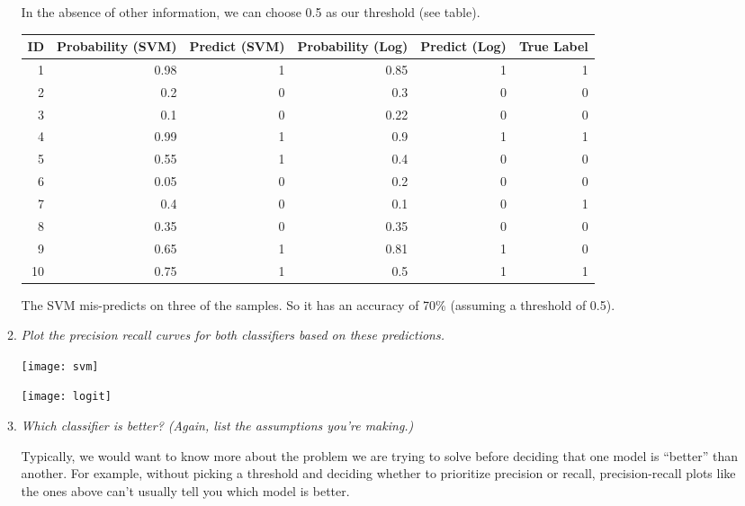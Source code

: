 \documentclass[11pt]{article}
\begin{document}
\begin{enumerate}
\begin{enumerate}
                In the absence of other information, we can choose 0.5 as our
                threshold (see table).

                \begin{table}[h!]
                \begin{tabular}{r|r|r|r|r|r}
                    ID & Probability (SVM) & Predict (SVM) & Probability (Log)
                    & Predict (Log) & True Label \\
                    \hline
                    1 & 0.98 & 1 & 0.85 & 1 & 1 \\
                    2 & 0.2 & 0 & 0.3 & 0 & 0 \\
                    3 & 0.1 & 0 & 0.22 & 0 & 0 \\
                    4 & 0.99 & 1 & 0.9 & 1 & 1 \\
                    5 & 0.55 & 1 & 0.4 & 0 & 0 \\
                    6 & 0.05 & 0 & 0.2 & 0 & 0 \\
                    7 & 0.4 & 0 & 0.1 & 0 & 1 \\
                    8 & 0.35 & 0 & 0.35 & 0 & 0 \\
                    9 & 0.65 & 1 & 0.81 & 1 & 0 \\
                    10 & 0.75 & 1 & 0.5 & 1 & 1 \\
                \end{tabular}
                \end{table}

                The SVM mis-predicts on three of the samples. So it has an
                accuracy of 70\% (assuming a threshold of 0.5).

            \item \textit{Plot the precision recall curves for both classifiers
                based on these predictions.}

                \begin{center}
                    \texttt{[image: svm]}

                    \texttt{[image: logit]}
                \end{center}

            \item \textit{Which classifier is better? (Again, list the
                assumptions you're making.)}

                Typically, we would want to know more about the problem we are
                trying to solve before deciding that one model is ``better''
                than another. For example, without picking a threshold and
                deciding whether to prioritize precision or recall,
                precision-recall plots like the ones above can't usually tell
                you which model is better.


\end{enumerate}
\end{enumerate}
\end{document}
